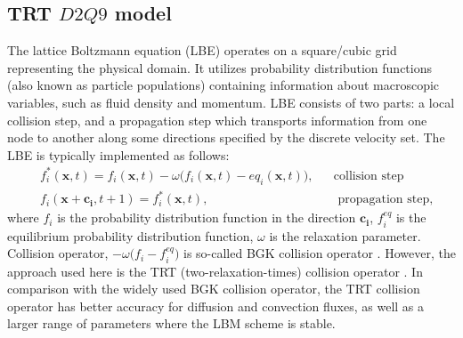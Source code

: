 \documentclass{article}
\begin{document}
\subsection{TRT $D2Q9$ model}
The lattice Boltzmann equation (LBE) operates on a square/cubic grid representing the
physical domain. It utilizes
probability distribution functions (also known as particle populations)
containing information about
macroscopic variables, such as fluid density and momentum. LBE consists of
two parts: a local collision step, and a propagation step which transports
information from one node to another along some 
directions specified by the discrete velocity set.
The LBE is typically implemented as follows:
\begin{equation}
\label{standard:implementation}
\begin{aligned}
&f_i^{*}(\bm{x},t)= f_i(\bm{x},t)-\omega \bigl(f_i(\bm{x},t)-eq_i(\bm{x},t)\bigr),&&\text{
collision step}\\
&f_i(\bm{x}+\bm{c_i},t+1)=f_i^{*}(\bm{x},t),&&\text{ propagation step}, 
\end{aligned}
\end{equation}
where $f_i$ is the probability distribution function in the direction $\bm{c_i}$,
 $f_i^{eq}$ is the equilibrium probability distribution function, $\omega$ is the
relaxation parameter. Collision operator, $-\omega \bigl(f_i- f_i^{eq}\bigr)$ is so-called BGK
collision operator \cite{bgk}. However, the approach used here is the TRT
(two-relaxation-times) collision operator \cite{ginzburg-main,ginzburg-saturated-flow}. In
comparison with the widely used BGK collision operator, the TRT collision operator has better accuracy
for diffusion and convection fluxes, as well as a larger range of parameters where the LBM scheme is stable.
\end{document}
